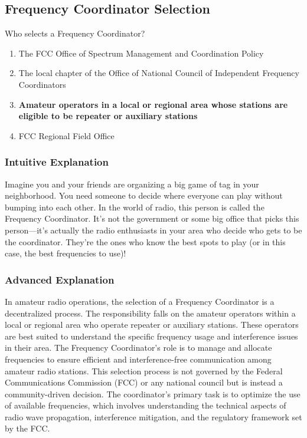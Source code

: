 \subsection{Frequency Coordinator Selection}
\label{T1A09}

\begin{tcolorbox}[colback=gray!10!white,colframe=black!75!black,title=T1A09]
Who selects a Frequency Coordinator?
\begin{enumerate}[label=\Alph*)]
    \item The FCC Office of Spectrum Management and Coordination Policy
    \item The local chapter of the Office of National Council of Independent Frequency Coordinators
    \item \textbf{Amateur operators in a local or regional area whose stations are eligible to be repeater or auxiliary stations}
    \item FCC Regional Field Office
\end{enumerate}
\end{tcolorbox}

\subsubsection{Intuitive Explanation}
Imagine you and your friends are organizing a big game of tag in your neighborhood. You need someone to decide where everyone can play without bumping into each other. In the world of radio, this person is called the Frequency Coordinator. It’s not the government or some big office that picks this person—it’s actually the radio enthusiasts in your area who decide who gets to be the coordinator. They’re the ones who know the best spots to play (or in this case, the best frequencies to use)!

\subsubsection{Advanced Explanation}
In amateur radio operations, the selection of a Frequency Coordinator is a decentralized process. The responsibility falls on the amateur operators within a local or regional area who operate repeater or auxiliary stations. These operators are best suited to understand the specific frequency usage and interference issues in their area. The Frequency Coordinator’s role is to manage and allocate frequencies to ensure efficient and interference-free communication among amateur radio stations. This selection process is not governed by the Federal Communications Commission (FCC) or any national council but is instead a community-driven decision. The coordinator’s primary task is to optimize the use of available frequencies, which involves understanding the technical aspects of radio wave propagation, interference mitigation, and the regulatory framework set by the FCC.

